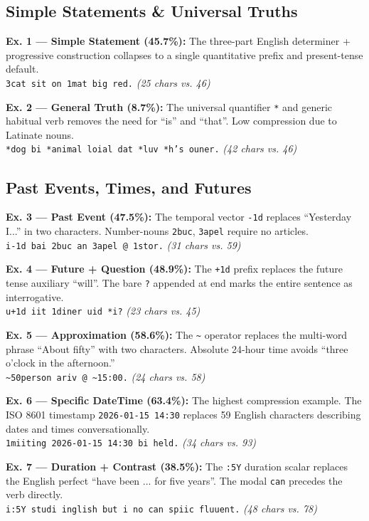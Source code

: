 \documentclass[10pt,twocolumn,letterpaper]{article}
\newcommand{\me}[1]{\texttt{#1}}
\begin{document}
\subsection{Simple Statements \& Universal Truths}

\textbf{Ex. 1 --- Simple Statement (45.7\%):} The three-part English determiner + progressive construction collapses to a single quantitative prefix and present-tense default.\\
\me{3cat sit on 1mat big red.} \textit{(25 chars vs. 46)}

\textbf{Ex. 2 --- General Truth (8.7\%):} The universal quantifier \me{*} and generic habitual verb removes the need for ``is'' and ``that''. Low compression due to Latinate nouns.\\
\me{*dog bi *animal loial dat *luv *h's ouner.} \textit{(42 chars vs. 46)}

\subsection{Past Events, Times, and Futures}

\textbf{Ex. 3 --- Past Event (47.5\%):} The temporal vector \me{-1d} replaces ``Yesterday I...'' in two characters. Number-nouns \me{2buc}, \me{3apel} require no articles.\\
\me{i-1d bai 2buc an 3apel @ 1stor.} \textit{(31 chars vs. 59)}

\textbf{Ex. 4 --- Future + Question (48.9\%):} The \me{+1d} prefix replaces the future tense auxiliary ``will''. The bare \me{?} appended at end marks the entire sentence as interrogative.\\
\me{u+1d iit 1diner uid *i?} \textit{(23 chars vs. 45)}

\textbf{Ex. 5 --- Approximation (58.6\%):} The \me{\~{}} operator replaces the multi-word phrase ``About fifty'' with two characters. Absolute 24-hour time avoids ``three o'clock in the afternoon.''\\
\me{\~{}50person ariv @ \~{}15:00.} \textit{(24 chars vs. 58)}

\textbf{Ex. 6 --- Specific DateTime (63.4\%):} The highest compression example. The ISO 8601 timestamp \me{2026-01-15 14:30} replaces 59 English characters describing dates and times conversationally.\\
\me{1miiting 2026-01-15 14:30 bi held.} \textit{(34 chars vs. 93)}

\textbf{Ex. 7 --- Duration + Contrast (38.5\%):} The \me{:5Y} duration scalar replaces the English perfect ``have been ... for five years''. The modal \me{can} precedes the verb directly.\\
\me{i:5Y studi inglish but i no can spiic fluuent.} \textit{(48 chars vs. 78)}
\end{document}
